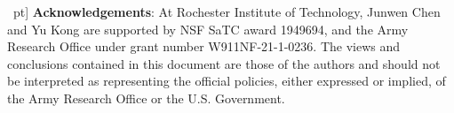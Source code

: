 \documentclass[10pt,twocolumn,letterpaper]{article}
\begin{document}
%
 ~\0pt]
\textbf{Acknowledgements}:
At Rochester Institute of Technology, Junwen Chen and Yu Kong are supported by NSF SaTC award 1949694, and the Army Research Office under grant number W911NF-21-1-0236. The views and conclusions contained in this document are those of the authors and should not be interpreted as representing the official policies, either expressed or implied, of the Army Research Office or the U.S. Government.


















































































































































{\small


}
\end{document}
